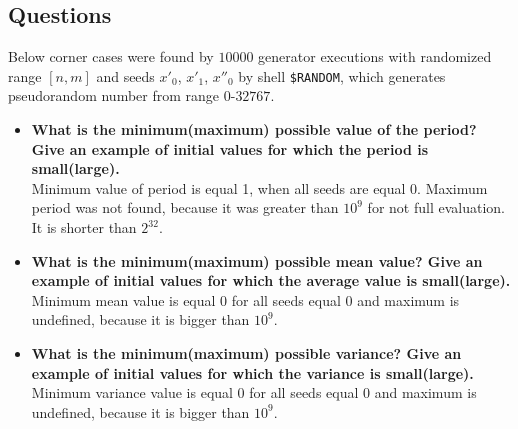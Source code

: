 \documentclass[a4paper,10pt]{article}
\begin{document}
\subsection{Questions}
Below corner cases were found by $10000$ generator executions with randomized range $[n,m]$ and seeds ${x'_0}$, ${x'_1}$, ${x''_0}$ by shell \texttt{\$RANDOM}, which generates pseudorandom number from range $0$-$32767$.
\begin{itemize}
 \item \textbf{What is the minimum(maximum) possible value of the period? Give an example of initial values for which the period is small(large).} \\ 
Minimum value of period is equal 1, when all seeds are equal 0. Maximum period was not found, because it was greater than $10^9$ for not full evaluation. It is shorter than $2^32$.
 \item \textbf{What is the minimum(maximum) possible mean value? Give an example of initial values for which the average value is small(large).} \\
Minimum mean value is equal 0 for all seeds equal 0 and maximum is undefined, because it is bigger than $10^9$.
 \item \textbf{What is the minimum(maximum) possible variance? Give an example of initial values for which the variance is small(large).} \\
Minimum variance value is equal 0 for all seeds equal 0 and maximum is undefined, because it is bigger than $10^9$.


\end{itemize}
\end{document}
